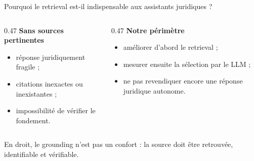 \documentclass[aspectratio=169,10pt]{beamer}
\newcommand{\keybox}[1]{%
  \begin{center}
  \colorbox{accentsoft}{\parbox{0.92\linewidth}{\centering #1}}
  \end{center}}
\begin{document}
\begin{frame}{Pourquoi le retrieval est-il indispensable aux assistants juridiques ?}
  \vspace{0.9em}
  \begin{columns}[T,onlytextwidth]
    \begin{column}{0.47\textwidth}
      \textbf{Sans sources pertinentes}
      \begin{itemize}\setlength{\itemsep}{0.3em}
        \item réponse juridiquement fragile ;
        \item citations inexactes ou inexistantes ;
        \item impossibilité de vérifier le fondement.
      \end{itemize}
    \end{column}
    \begin{column}{0.47\textwidth}
      \textbf{Notre périmètre}
      \begin{itemize}\setlength{\itemsep}{0.3em}
        \item améliorer d'abord le retrieval ;
        \item mesurer ensuite la sélection par le LLM ;
        \item ne pas revendiquer encore une réponse juridique autonome.
      \end{itemize}
    \end{column}
  \end{columns}

  \keybox{\scriptsize En droit, le grounding n'est pas un confort : la source doit être retrouvée,
  identifiable et vérifiable.}
\end{frame}
\end{document}
